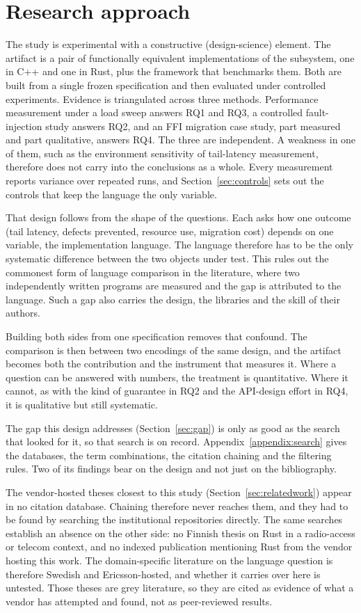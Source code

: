 \documentclass[english,oneside,a4paper,censored,csm,software-track-2020]{HYthesisML}
\begin{document}
\section{Research approach}\label{sec:approach}
The study is experimental with a constructive (design-science) element. The artifact is a pair
of functionally equivalent implementations of the subsystem, one in C++ and one in Rust, plus
the framework that benchmarks them. Both are built from a single frozen specification and then
evaluated under controlled experiments. Evidence is triangulated across three methods.
Performance measurement under a load sweep answers RQ1 and RQ3, a controlled fault-injection
study answers RQ2, and an FFI migration case study, part measured and part qualitative, answers
RQ4. The three are independent. A weakness in one of them, such as the environment sensitivity
of tail-latency measurement, therefore does not carry into the conclusions as a whole. Every
measurement reports variance over repeated runs, and Section~\ref{sec:controls} sets out the
controls that keep the language the only variable.

That design follows from the shape of the questions. Each asks how one outcome (tail latency,
defects prevented, resource use, migration cost) depends on one variable, the implementation
language. The language therefore has to be the only systematic difference between the two
objects under test. This rules out the commonest form of language comparison in the literature,
where two independently written programs are measured and the gap is attributed to the language.
Such a gap also carries the design, the libraries and the skill of their authors.

Building both sides from one specification removes that confound. The comparison is then between
two encodings of the same design, and the artifact becomes both the contribution and the
instrument that measures it. Where a question can be answered with numbers, the treatment is
quantitative. Where it cannot, as with the kind of guarantee in RQ2 and the API-design effort in
RQ4, it is qualitative but still systematic.

The gap this design addresses (Section~\ref{sec:gap}) is only as good as the search that looked
for it, so that search is on record. Appendix~\ref{appendix:search} gives the databases, the term
combinations, the citation chaining and the filtering rules. Two of its findings bear on the
design and not just on the bibliography.

The vendor-hosted theses closest to this study (Section~\ref{sec:relatedwork}) appear in no
citation database. Chaining therefore never reaches them, and they had to be found by searching
the institutional repositories directly. The same searches establish an absence on the other
side: no Finnish thesis on Rust in a radio-access or telecom context, and no indexed publication
mentioning Rust from the vendor hosting this work. The domain-specific literature on the
language question is therefore Swedish and Ericsson-hosted, and whether it carries over here is
untested. Those theses are grey literature, so they are cited as evidence of what a vendor has
attempted and found, not as peer-reviewed results.
\end{document}

